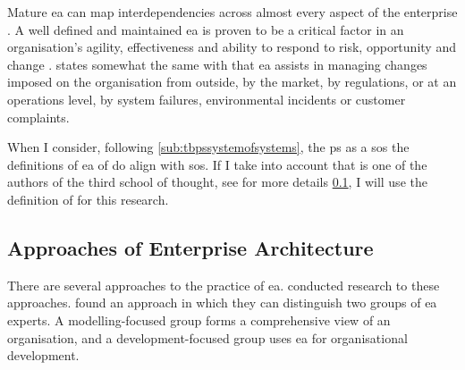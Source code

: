 Mature \acrshort{ea} can map interdependencies across almost every aspect of the enterprise \parencite[p.~5]{Graves2009}. A well defined and maintained \acrshort{ea} is proven to be a critical factor in an organisation's agility, effectiveness and ability to respond to risk, opportunity and change \parencite{Ross2014}. \textcite[p.~5]{Graves2009} states somewhat the same with that \acrshort{ea} assists in managing changes imposed on the organisation from outside, by the market, by regulations, or at an operations level, by system failures, environmental incidents or customer complaints.

When I consider, following \cref{sub:tbpssystemofsystems}, the \gls{ps} as a \acrfull{sos} the definitions of \acrshort{ea} of \textcites{Gartner}{Graves2009} do align with \acrshort{sos}. If I take into account that \textcite{Graves2009} is one of the authors of the third school of thought, see for more details \cref{sub:eaapproaches}, I will use the definition of \citeauthor{Graves2009} for this research.

\subsection{Approaches of Enterprise Architecture}
\label{sub:eaapproaches}
There are several approaches to the practice of \acrshort{ea}. \textcites{Lapalme2012}{Kotusev2015}{Ylinen2018}{Ylinen2020} conducted research to these approaches. \textcites{Ylinen2018}{Ylinen2020} found an approach in which they can distinguish two groups of \acrshort{ea} experts. A modelling-focused group forms a comprehensive view of an organisation, and a development-focused group uses \acrshort{ea} for organisational development. 


